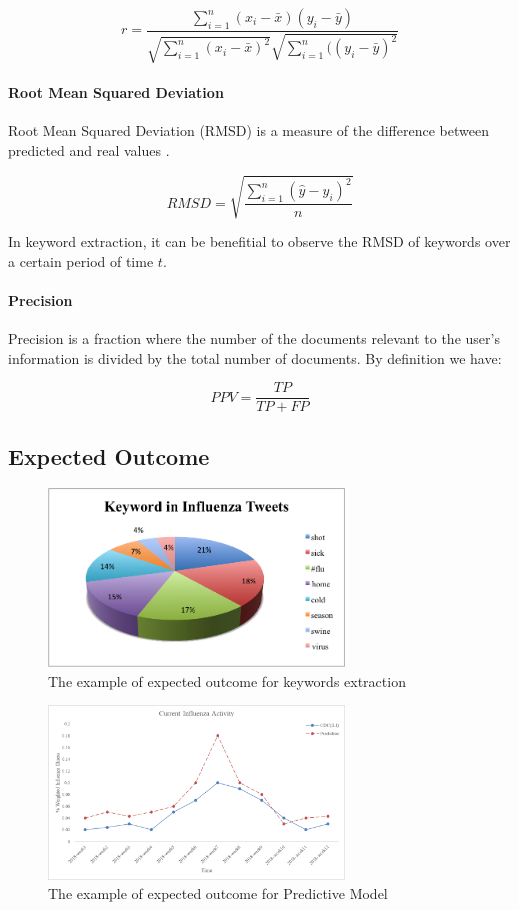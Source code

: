 \documentclass[12pt, oneside]{article}
\begin{document}
$$ r = \frac{\sum_{i=1}^n(x_i-\bar{x})(y_i-\bar{y})}{\sqrt{\sum_{i=1}^n(x_i-\bar{x})^2}\sqrt{\sum_{i=1}^n((y_i-\bar{y})^2}}$$

\paragraph{Root Mean Squared Deviation}
Root Mean Squared Deviation (RMSD) is a measure of the difference between predicted and real values \cite{wiki:root-mean-square}.

$$RMSD = \sqrt{\frac{\sum_{i=1}^{n}(\hat{y}-y_i)^2}{n}}$$

In keyword extraction, it can be benefitial to observe the RMSD of keywords over a certain period of time $t$.

\paragraph{Precision}
Precision is a fraction where the number of the documents relevant to the user's information is divided by the total number of documents. By definition we have:

$$PPV = \frac{TP}{TP+FP}$$


\subsection{Expected Outcome}


\begin{figure}[h]
    \centering
    \includegraphics[width=0.7\textwidth]{TweetsWords.png}
    \caption{The example of expected outcome for keywords extraction}
    \label{fig:fig1}
\end{figure}

\begin{figure}[h]
    \centering
    \includegraphics[width=0.7\textwidth]{predictions.png}
    \caption{The example of expected outcome for Predictive Model}
    \label{fig:fig2}
\end{figure}
\end{document}

